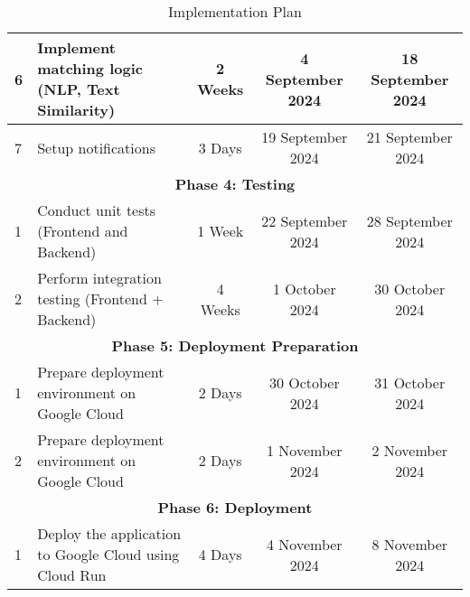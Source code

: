 \begin{table}[h!]
\begin{tabular}{|l|p{5cm}|c|c|c|}
6 & Implement matching logic (NLP, Text Similarity) & 2 Weeks & 4 September 2024 & 18 September 2024 \\ \hline
7 & Setup notifications & 3 Days & 19 September 2024 & 21 September 2024 \\ \hline
\multicolumn{5}{|c|}{\textbf{Phase 4: Testing}} \\
\hline
1 & Conduct unit tests (Frontend and Backend) & 1 Week & 22 September 2024 & 28 September 2024 \\
\hline
2 & Perform integration testing (Frontend + Backend) & 4 Weeks & 1 October 2024 & 30 October 2024 \\
\hline
\multicolumn{5}{|c|}{\textbf{Phase 5: Deployment Preparation}} \\
\hline
1 & Prepare deployment environment on Google Cloud & 2 Days & 30 October 2024 & 31 October 2024 \\
\hline
2 & Prepare deployment environment on Google Cloud & 2 Days & 1 November 2024 & 2 November 2024 \\
\hline
\multicolumn{5}{|c|}{\textbf{Phase 6: Deployment}} \\
\hline
1 & Deploy the application to Google Cloud using Cloud Run & 4 Days & 4 November 2024 & 8 November 2024 \\
\hline
\end{tabular}
\caption{Implementation Plan}
\end{table}

